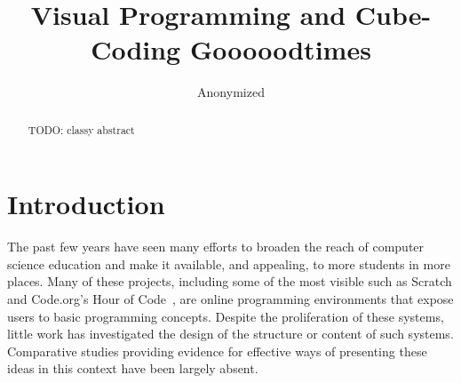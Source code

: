 \documentclass{sig-alternate}
\newcommand{\TODO}[1]{{\color{red} TODO: #1}}
\begin{document}
%

\title{Visual Programming and Cube-Coding Gooooodtimes}

\author{Anonymized}


\maketitle
\begin{abstract}
\TODO{classy abstract}
\end{abstract}




\section{Introduction}
The past few years have seen many efforts to broaden the reach of computer science education and make it available, and appealing, to more students in more places. Many of these projects, including some of the most visible such as Scratch and Code.org's Hour of Code~\cite{codedotorg}, are online programming environments that expose users to basic programming concepts. Despite the proliferation of these systems, little work has investigated the design of the structure or content of such systems. Comparative studies providing evidence for effective ways of presenting these ideas in this context have been largely absent. 
\end{document}
